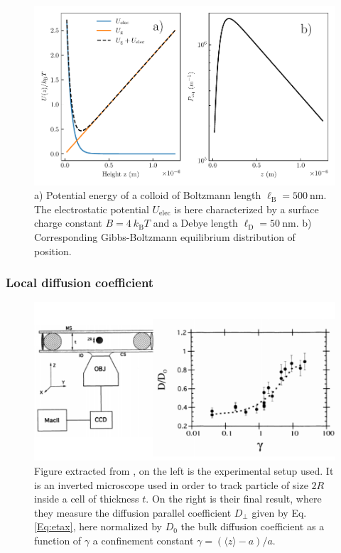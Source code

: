 \begin{figure}[h]
	\centering
	\includegraphics{02_body/chapter3/images/potential/potential_exemple.pdf}
	\caption{ a) Potential energy of a colloid of Boltzmann length $\ell_\mathrm{B} = 500 ~ \mathrm{nm} $. The electrostatic potential $U_\mathrm{elec}$ is here characterized by a surface charge constant $B = 4 ~k_\mathrm{B}T$ and a Debye length $\ell_\mathrm{D} = 50 ~ \mathrm{nm}$. b) Corresponding Gibbs-Boltzmann equilibrium distribution of position. }
	\label{Fig:potential}
\end{figure}

\subsubsection{Local diffusion coefficient}

\begin{figure}
	\centering
	\includegraphics{02_body/chapter1/image/libchaber.pdf}
	\caption{Figure extracted from \cite{faucheux_confined_1994}, on the left is the experimental setup used. It is an inverted microscope used in order to track particle of size $2R$ inside a cell of thickness $t$. On the right is their final result, where they measure the diffusion parallel coefficient $D_\bot$ given by Eq.\ref{Eq:etax}, here normalized by $D_0$ the bulk diffusion coefficient as a function of  $\gamma$ a confinement constant $\gamma = (\langle z \rangle -a)/a$. }
	\label{fig:libchaber}
\end{figure}


